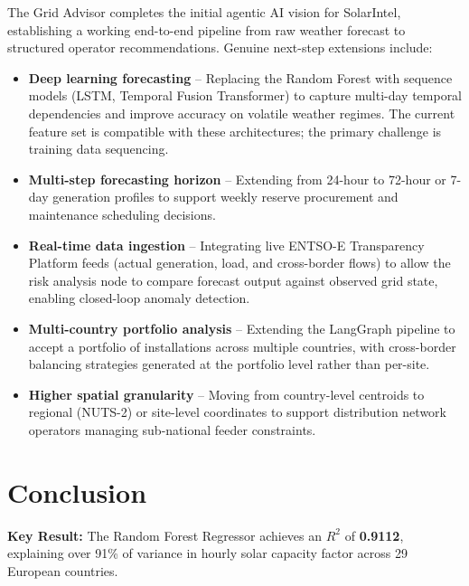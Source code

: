 \documentclass[12pt, a4paper]{article}
\begin{document}
The Grid Advisor completes the initial agentic AI vision for SolarIntel, establishing a working end-to-end pipeline from raw weather forecast to structured operator recommendations. Genuine next-step extensions include:

\begin{itemize}[noitemsep]
    \item \textbf{Deep learning forecasting} -- Replacing the Random Forest with sequence models (LSTM, Temporal Fusion Transformer) to capture multi-day temporal dependencies and improve accuracy on volatile weather regimes. The current feature set is compatible with these architectures; the primary challenge is training data sequencing.
    \item \textbf{Multi-step forecasting horizon} -- Extending from 24-hour to 72-hour or 7-day generation profiles to support weekly reserve procurement and maintenance scheduling decisions.
    \item \textbf{Real-time data ingestion} -- Integrating live ENTSO-E Transparency Platform feeds (actual generation, load, and cross-border flows) to allow the risk analysis node to compare forecast output against observed grid state, enabling closed-loop anomaly detection.
    \item \textbf{Multi-country portfolio analysis} -- Extending the LangGraph pipeline to accept a portfolio of installations across multiple countries, with cross-border balancing strategies generated at the portfolio level rather than per-site.
    \item \textbf{Higher spatial granularity} -- Moving from country-level centroids to regional (NUTS-2) or site-level coordinates to support distribution network operators managing sub-national feeder constraints.
\end{itemize}

\clearpage
\section{Conclusion}

\begin{center}
\colorbox{solarblue!8}{\parbox{0.9\textwidth}{\centering\textbf{\color{solarblue}Key Result:} The Random Forest Regressor achieves an $R^2$ of \textbf{0.9112}, explaining over 91\% of variance in hourly solar capacity factor across 29 European countries.}}
\end{center}

\vspace{0.3cm}
\end{document}
